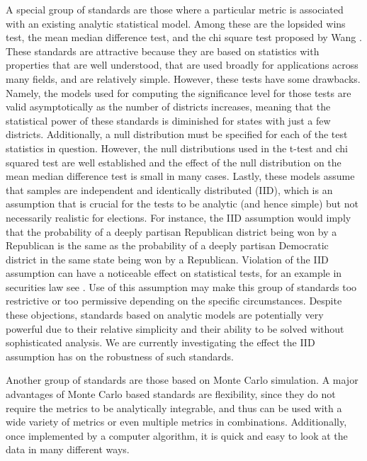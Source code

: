 \documentclass[preprint,12pt]{article}
\begin{document}
A special group of standards are those where a particular metric is associated with an existing analytic statistical model.
Among these are the lopsided wins test, the mean median difference test, and the chi square test proposed by Wang \cite{Wang__,Wang_2016_10.1089/elj.2016.0387}.
These standards are attractive because they are based on statistics with properties that are well understood, that are used broadly for applications across many fields, and are relatively simple.
However, these tests have some drawbacks.
Namely, the models used for computing the significance level for those tests are valid asymptotically as the number of districts increases, meaning that the statistical power of these standards is diminished for states with just a few districts.
Additionally, a null distribution must be specified for each of the test statistics in question. 
However, the null distributions used in the t-test and chi squared test are well established and the effect of the null distribution on the mean median difference test is small in many cases. \cite{Cabilio_1996_10.2307/3315744,Zheng_2010_}
Lastly, these models assume that samples are independent and identically distributed (IID), which is an assumption that is crucial for the tests to be analytic (and hence simple) but not necessarily realistic for elections.
For instance, the IID assumption would imply that the probability of a deeply partisan Republican district being won by a Republican is the same as the probability of a deeply partisan Democratic district in the same state being won by a Republican.
Violation of the IID assumption can have a noticeable effect on statistical tests, for an example in securities law see \cite{Gel_2009_10.1093/lpr/mgp008}. 
Use of this assumption may make this group of standards too restrictive or too permissive depending on the specific circumstances.
Despite these objections, standards based on analytic models are potentially very powerful due to their relative simplicity and their ability to be solved without sophisticated analysis.
We are currently investigating the effect the IID assumption has on the robustness of such standards.

Another group of standards are those based on Monte Carlo simulation.
A major advantages of Monte Carlo based standards are flexibility, since they do not require the metrics to be analytically integrable, and thus can be used with a wide variety of metrics or even multiple metrics in combinations.
Additionally, once implemented by a computer algorithm, it is quick and easy to look at the data in many different ways.
\end{document}
